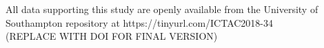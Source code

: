 \documentclass[runningheads,a4paper]{llncs}
\begin{document}
\begin{footnotesize} %
\vspace{10 pt}
\par
\noindent
All data supporting this study are openly available from the University of Southampton repository at
https://tinyurl.com/ICTAC2018-34  \\
(REPLACE WITH DOI FOR FINAL VERSION)
\end{footnotesize} %




\end{document}
